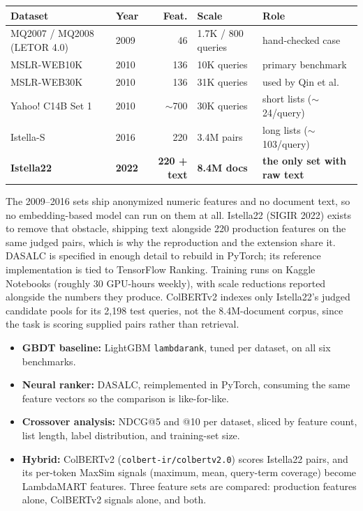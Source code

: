 \documentclass[11pt]{article}
\newcommand{\head}[1]{\smallskip\noindent{\color{DarkBlue}\textbf{#1}}}
\begin{document}
{\footnotesize\noindent\begin{tabular}{@{}llrll@{}}
\toprule
\textbf{Dataset} & \textbf{Year} & \textbf{Feat.} & \textbf{Scale} & \textbf{Role} \\
\midrule
MQ2007 / MQ2008 (LETOR 4.0) & 2009 & 46 & 1.7K / 800 queries & hand-checked case \\
MSLR-WEB10K & 2010 & 136 & 10K queries & primary benchmark \\
MSLR-WEB30K & 2010 & 136 & 31K queries & used by Qin et al. \\
Yahoo! C14B Set 1 & 2010 & $\sim$700 & 30K queries & short lists ($\sim$24/query) \\
Istella-S & 2016 & 220 & 3.4M pairs & long lists ($\sim$103/query) \\
\textbf{Istella22} & \textbf{2022} & \textbf{220 + text} & \textbf{8.4M docs} & \textbf{the only set with raw text} \\
\bottomrule
\end{tabular}}

\smallskip

\noindent The 2009--2016 sets ship anonymized numeric features and no document text, so no embedding-based model can run on them at all. Istella22 (SIGIR 2022) exists to remove that obstacle, shipping text alongside 220 production features on the same judged pairs, which is why the reproduction and the extension share it. DASALC is specified in enough detail to rebuild in PyTorch; its reference implementation is tied to TensorFlow Ranking. Training runs on Kaggle Notebooks (roughly 30 GPU-hours weekly), with scale reductions reported alongside the numbers they produce. ColBERTv2 indexes only Istella22's judged candidate pools for its 2,198 test queries, not the 8.4M-document corpus, since the task is scoring supplied pairs rather than retrieval.

\head{Method and baselines.}
\begin{itemize}
\item \textbf{GBDT baseline:} LightGBM \texttt{lambdarank}, tuned per dataset, on all six benchmarks.
\item \textbf{Neural ranker:} DASALC, reimplemented in PyTorch, consuming the same feature vectors so the comparison is like-for-like.
\item \textbf{Crossover analysis:} NDCG@5 and @10 per dataset, sliced by feature count, list length, label distribution, and training-set size.
\item \textbf{Hybrid:} ColBERTv2 (\texttt{colbert-ir/colbertv2.0}) scores Istella22 pairs, and its per-token MaxSim signals (maximum, mean, query-term coverage) become LambdaMART features. Three feature sets are compared: production features alone, ColBERTv2 signals alone, and both.
\end{itemize}
\end{document}
